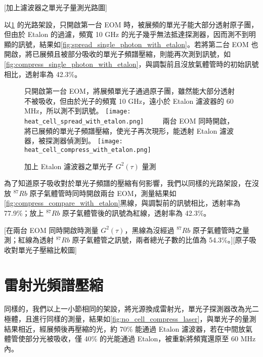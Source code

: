 \documentclass[class=NCU_thesis, crop=false]{standalone}
\begin{document}
[加上濾波器之單光子量測光路圖]

以\cref{fig:single_photon_with_etalon} 的光路架設，只開啟第一台 EOM 時，被展頻的單光子能大部分透射原子團，但由於 Etalon 的過濾，頻寬 10 GHz 的光子幾乎無法抵達探測器，因而測不到明顯的訊號，結果如\cref{fig:spread_single_photon_with_etalon}。若將第二台 EOM 也開啟，將已展頻且被部分吸收的單光子頻譜壓縮，則能再次測到訊號，如\cref{fig:compress_single_photon_with_etalon}，與調製前且沒放氣體管時的初始訊號相比，透射率為 42.3\%。

\begin{figure}[!hbt]
    \centering
    \subcaptionbox
        {只開啟第一台 EOM，將展頻單光子通過原子團，雖然能大部分透射不被吸收，但由於光子的頻寬 10 GHz，遠小於 Etalon 濾波器的 60 MHz，所以測不到訊號。
        \label{fig:spread_single_photon_with_etalon}}
        {\texttt{[image: heat\_cell\_spread\_with\_etalon.png]}}
    ~~~~
    \subcaptionbox
        {兩台 EOM 同時開啟，將已展頻的單光子頻譜壓縮，使光子再次現形，能透射 Etalon 濾波器，被探測器偵測到。
        \label{fig:compress_single_photon_with_etalon}}
        {\texttt{[image: heat\_cell\_compress\_with\_etalon.png]}}
    \caption{加上 Etalon 濾波器之單光子 $G^{2}(\tau)$ 量測}
    \label{fig:single_photon_with_etalon}
\end{figure}

為了知道原子吸收對於單光子頻譜的壓縮有何影響，我們以同樣的光路架設，在沒放 $^{87}Rb$ 原子氣體管時同時開啟兩台 EOM，測量結果如\cref{fig:compress_compare_with_etalon}黑線，與調製前的訊號相比，透射率為 77.9\%；放上 $^{87}Rb$ 原子氣體管後的訊號為紅線，透射率為 42.3\%。

[在兩台 EOM 同時開啟時測量 $G^{2}(\tau)$，黑線為沒經過 $^{87}Rb$ 原子氣體管時之量測；紅線為透射 $^{87}Rb$ 原子氣體管之訊號，兩者總光子數的比值為 54.3\%。][原子吸收對單光子壓縮比較圖]

\section{雷射光頻譜壓縮}

同樣的，我們以上一小節相同的架設，將光源換成雷射光，單光子探測器改為光二極體，且進行同樣的測量，結果如\cref{fig:no_cell_compress_laser}，與單光子的量測結果相近，經展頻後再壓縮的光，約 70\% 能通過 Etalon 濾波器，若在中間放氣體管使部分光被吸收，僅 40\% 的光能通過 Etalon，被重新將頻寬還原至 60 MHz 內。
\end{document}
